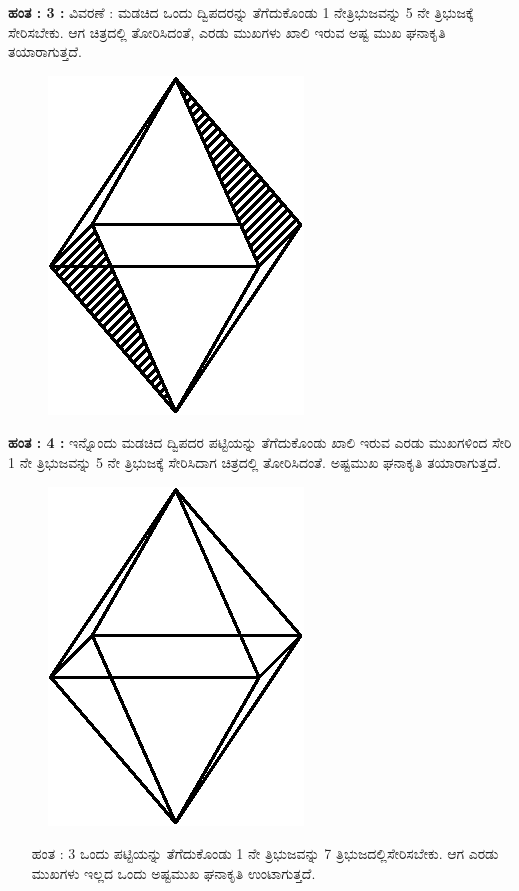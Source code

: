 \begin{enumerate}

\noindent
\textbf{ಹಂತ : 3 :} ವಿವರಣೆ : ಮಡಚಿದ ಒಂದು ದ್ವಿಪದರನ್ನು ತೆಗೆದುಕೊಂಡು 1 ನೇ\break  ತ್ರಿಭುಜವನ್ನು  5 ನೇ ತ್ರಿಭುಜಕ್ಕೆ  ಸೇರಿಸಬೇಕು. ಆಗ ಚಿತ್ರದಲ್ಲಿ ತೋರಿಸಿದಂತೆ, ಎರಡು ಮುಖಗಳು ಖಾಲಿ ಇರುವ ಅಷ್ಟ ಮುಖ ಘನಾಕೃತಿ ತಯಾರಾಗುತ್ತದೆ. 
\begin{figure}[H]
\centering
\includegraphics[scale=.98]{src/figure/chap1/fig1-20d.eps}
\end{figure}

 
 \noindent
\textbf{ಹಂತ : 4 :} ಇನ್ನೊಂದು ಮಡಚಿದ ದ್ವಿಪದರ ಪಟ್ಟಿಯನ್ನು ತೆಗೆದುಕೊಂಡು ಖಾಲಿ ಇರುವ ಎರಡು ಮುಖಗಳಿಂದ ಸೇರಿ 1 ನೇ ತ್ರಿಭುಜವನ್ನು 5  ನೇ ತ್ರಿಭುಜಕ್ಕೆ  ಸೇರಿಸಿದಾಗ  ಚಿತ್ರದಲ್ಲಿ ತೋರಿಸಿದಂತೆ. ಅಷ್ಟಮುಖ ಘನಾಕೃತಿ ತಯಾರಾಗುತ್ತದೆ. 
\begin{figure}[H]
\centering
\includegraphics[scale=.98]{src/figure/chap1/fig1-20e.eps}\\
\end{figure}
\begin{itemize}
\item[ಹಂತ : 3] ಒಂದು ಪಟ್ಟಿಯನ್ನು ತೆಗೆದುಕೊಂಡು 1 ನೇ ತ್ರಿಭುಜವನ್ನು 7 ತ್ರಿಭುಜದಲ್ಲಿ\break ಸೇರಿಸಬೇಕು. ಆಗ ಎರಡು ಮುಖಗಳು ಇಲ್ಲದ ಒಂದು ಅಷ್ಟಮುಖ ಘನಾಕೃತಿ ಉಂಟಾಗುತ್ತದೆ. 


\end{itemize}
\end{enumerate}
